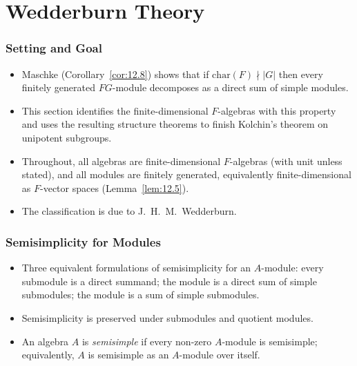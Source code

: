 \documentclass[../Odyssey_Project.tex]{subfiles}
\begin{document}
\setcounter{section}{12}
\section{Wedderburn Theory}

\subsubsection*{Setting and Goal}
\begin{itemize}
    \item Maschke (Corollary~\ref{cor:12.8}) shows that if $\mathrm{char}(F) \nmid |G|$ then every finitely generated $FG$-module decomposes as a direct sum of simple modules.
    \item This section identifies the finite-dimensional $F$-algebras with this property and uses the resulting structure theorems to finish Kolchin's theorem on unipotent subgroups.
    \item Throughout, all algebras are finite-dimensional $F$-algebras (with unit unless stated), and all modules are finitely generated, equivalently finite-dimensional as $F$-vector spaces (Lemma~\ref{lem:12.5}).
    \item The classification is due to J.~H.~M.~Wedderburn.
\end{itemize}

\subsubsection*{Semisimplicity for Modules}
\begin{itemize}
    \item Three equivalent formulations of semisimplicity for an $A$-module: every submodule is a direct summand; the module is a direct sum of simple submodules; the module is a sum of simple submodules.
    \item Semisimplicity is preserved under submodules and quotient modules.
    \item An algebra $A$ is \emph{semisimple} if every non-zero $A$-module is semisimple; equivalently, $A$ is semisimple as an $A$-module over itself.
\end{itemize}
\end{document}

